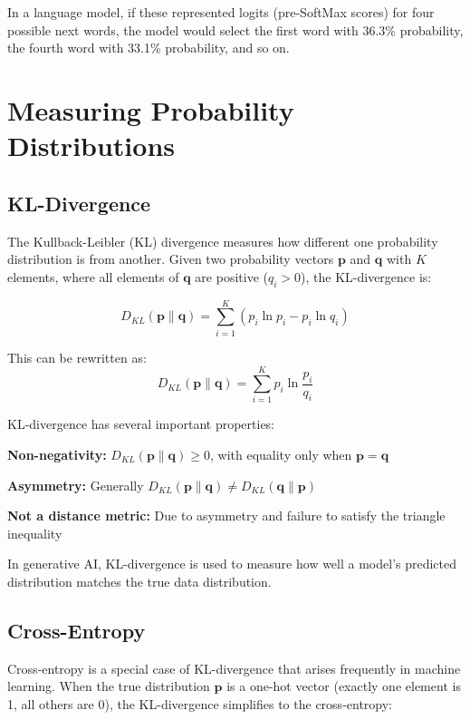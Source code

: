 \documentclass{book}
\begin{document}
In a language model, if these represented logits (pre-SoftMax scores) for four possible next words, the model would select the first word with 36.3\% probability, the fourth word with 33.1\% probability, and so on.

\section{Measuring Probability Distributions}

\subsection{KL-Divergence}
\label{sec:kl-divergence}

The Kullback-Leibler (KL) divergence measures how different one probability distribution is from another. Given two probability vectors $\mathbf{p}$ and $\mathbf{q}$ with $K$ elements, where all elements of $\mathbf{q}$ are positive ($q_i > 0$), the KL-divergence is:

\begin{equation}
D_{KL}(\mathbf{p} \| \mathbf{q}) = \sum_{i=1}^{K} \left( p_i \ln p_i - p_i \ln q_i \right)
\end{equation}

This can be rewritten as:
\begin{equation}
D_{KL}(\mathbf{p} \| \mathbf{q}) = \sum_{i=1}^{K} p_i \ln \frac{p_i}{q_i}
\end{equation}

KL-divergence has several important properties:

\textbf{Non-negativity:} $D_{KL}(\mathbf{p} \| \mathbf{q}) \geq 0$, with equality only when $\mathbf{p} = \mathbf{q}$

\textbf{Asymmetry:} Generally $D_{KL}(\mathbf{p} \| \mathbf{q}) \neq D_{KL}(\mathbf{q} \| \mathbf{p})$

\textbf{Not a distance metric:} Due to asymmetry and failure to satisfy the triangle inequality

In generative AI, KL-divergence is used to measure how well a model's predicted distribution matches the true data distribution.

\subsection{Cross-Entropy}
\label{sec:cross-entropy}

Cross-entropy is a special case of KL-divergence that arises frequently in machine learning. When the true distribution $\mathbf{p}$ is a one-hot vector (exactly one element is 1, all others are 0), the KL-divergence simplifies to the cross-entropy:
\end{document}
